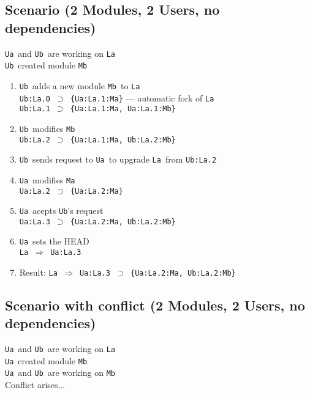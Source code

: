 \documentclass[10pt]{article}
\def\Ua{{\tt Ua}}
\def\Ub{{\tt Ub}}
\def\La{{\tt La}}
\def\Ma{{\tt Ma}}
\def\Mb{{\tt Mb}}
\def\headsto{${\Longrightarrow}$ }
\def\hto{\headsto}
\def\eq{${\supset}$ }
\begin{document}
	\subsection{Scenario (2 Modules, 2 Users, no dependencies)}
	
		\Ua\ and \Ub\ are working on \La\\ 
		\Ub\ created module \Mb\
		
		\begin{enumerate}
			\item{\Ub\ adds a new module \Mb\ to \La\\
				{\tt Ub:La.0 \eq \{Ua:La.1:Ma\}} --- automatic fork of \La\\
				{\tt Ub:La.1 \eq \{Ua:La.1:Ma, Ua:La.1:Mb\}}
			}
			\item{\Ub\ modifies \Mb\\
				{\tt Ub:La.2 \eq \{Ua:La.1:Ma, Ub:La.2:Mb\}}
			}
			\item{\Ub\ sends request to \Ua\ to upgrade \La\ from {\tt Ub:La.2}}
			\item{\Ua\ modifies \Ma\\
				{\tt Ua:La.2 \eq \{Ua:La.2:Ma\}}
			}
			\item{\Ua\ acepts \Ub's request\\
				{\tt Ua:La.3 \eq \{Ua:La.2:Ma, Ub:La.2:Mb\}}
			}
			\item{\Ua\ sets the HEAD\\
				{\tt La \hto Ua:La.3}
			}
			\item{Result: {\tt La \hto Ua:La.3 \eq \{Ua:La.2:Ma, Ub:La.2:Mb\}}}
		\end{enumerate}

	\subsection{Scenario with conflict (2 Modules, 2 Users, no dependencies)}

		\Ua\ and \Ub\ are working on \La\\ 
		\Ua\ created module \Mb\\
		\Ua\ and \Ub\ are working on \Mb\\
		Conflict arises...
\end{document}
